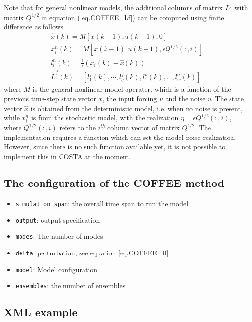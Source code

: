 Note that for general nonlinear models, the additional columns of matrix $L^f$
with matrix $Q^{1/2}$ in equation (\ref{eq.COFFEE_Lf}) can be computed using
finite difference as follows
\begin{eqnarray}
  \hat{x}(k) = M[x(k-1),u(k-1),0] \\
  x^n_i(k) = M[x(k-1),u(k-1),\epsilon Q^{1/2}(:,i)] \\
  l^n_i(k) =  \frac{1}{\epsilon} (x_i(k) - \hat{x}(k))\\
  \tilde{L}^f(k)=[l_1^f(k),\cdots,l_q^f(k),l^n_1(k),...,l^n_w(k)]
\end{eqnarray}
where $M$ is the general nonlinear model operator, which is a function of the
previous time-step state vector $x$, the input forcing $u$ and the noise
$\eta$. The state vector $\hat{x}$ is obtained from the deterministic model,
i.e. when no noise is present, while $x^n_i$ is from the stochastic model, with
the realization $\eta=\epsilon Q^{1/2}(:,i)$, where $Q^{1/2}(:,i)$ refers to
the $i^{th}$ column vector of matrix $Q^{1/2}$. The implementation requires a
function which can set the model noise realization. However, since there is no
such function available yet, it is not possible to implement this in COSTA at
the moment.

\subsection{The configuration of the COFFEE method}
\begin{itemize}

\item {\tt simulation\_span}: the overall time span to run the model
\item {\tt output}: output specification
\item {\tt modes}: The number of modes
\item {\tt delta}: perturbation, see equation \ref{eq.COFFEE_lf}
\item {\tt model}: Model configuration
\item {\tt ensembles}: the number of ensembles
\end{itemize}

\subsection{XML example}

